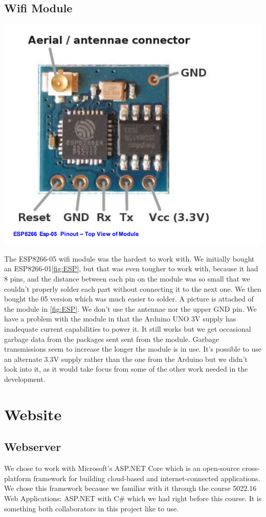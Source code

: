 \documentclass[a4paper,12pt,twoside,openright,titlepage]{book}
\begin{document}
\section{Wifi Module}
\begin{center}
	\includegraphics[scale=0.3]{ESP8266}
\end{center}

The ESP8266-05 wifi module was the hardest to work with. We initially bought an ESP8266-01\ref{fig:ESP}, but that was even tougher to work with, because it had 8 pins, and the distance between each pin on the module was so small that we couldn't properly solder each part without connecting it to the next one. We then bought the 05 version which was much easier to solder. A picture is attached of the module in \ref{fig:ESP}. We don't use the antennae nor the upper GND pin. We have a problem with the module in that the Arduino UNO 3V supply has inadequate current capabilities to power it. It still works but we get occasional garbage data from the packages sent sent from the module. Garbage transmissions seem to increase the longer the module is in use. It's possible to use an alternate 3.3V supply rather than the one from the Arduino but we didn't look into it, as it would take focus from some of the other work needed in the development.

\chapter{Website}
\section*{Webserver}
We chose to work with Microsoft's ASP.NET Core which is an open-source cross-platform framework for building cloud-based and internet-connected applications. We chose this framework because we familiar with it through the course 5022.16 Web Applications: ASP.NET with C\# which we had right before this course. It is something both collaborators in this project like to use. 
\end{document}
